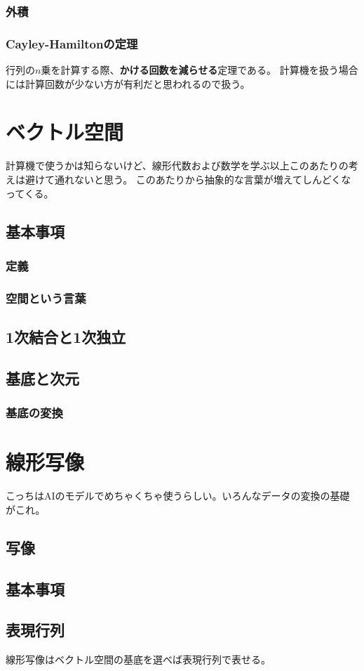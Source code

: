 \documentclass[10pt]{jsreport}
\theoremstyle{definition}%
\numberwithin{equation}{section}%
\begin{document}
\subsubsection{外積}
\subsubsection{Cayley-Hamiltonの定理}
行列の$n$乗を計算する際、{\bf かける回数を減らせる}定理である。
計算機を扱う場合には計算回数が少ない方が有利だと思われるので扱う。
\section{ベクトル空間}
計算機で使うかは知らないけど、線形代数および数学を学ぶ以上このあたりの考えは避けて通れないと思う。
このあたりから抽象的な言葉が増えてしんどくなってくる。
\subsection{基本事項}
\subsubsection{定義}
\subsubsection{空間という言葉}
\subsection{1次結合と1次独立}
\subsection{基底と次元}
\subsubsection{基底の変換}
\section{線形写像}
こっちはAIのモデルでめちゃくちゃ使うらしい。いろんなデータの変換の基礎がこれ。
\subsection{写像}
\subsection{基本事項}
\subsection{表現行列}
線形写像はベクトル空間の基底を選べば表現行列で表せる。
\end{document}

